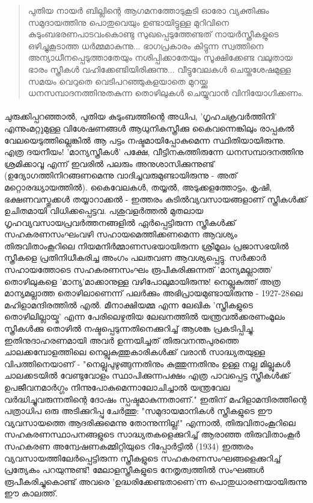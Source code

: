 \begin{quotation}
\noindent
പുതിയ  നായർ ബില്ലിന്റെ ആഗമനത്തോടുകൂടി ഓരോ വ്യക്തിക്കും സമുദായത്തിനു പൊതുവെയും ഉണ്ടായിട്ടുള്ള മുറിവിനെ കുടുംബഭരണപാടവംകൊണ്ടു സുഖപ്പെടുത്തേണ്ടത് നായർസ്ത്രീകളുടെ ഒഴിച്ചുകൂടാത്ത ധർമ്മമാകുന്നു...
ഭാഗപ്രകാരം കിട്ടുന്ന സ്വത്തിനെ അന്യാധീനപ്പെടുത്താതേയും നശിപ്പിക്കാതേയും സൂക്ഷിക്കേണ്ട വലുതായ ഭാരം സ്ത്രീകൾ വഹിക്കേണ്ടിയിരിക്കുന്നു... വീട്ടുവേലകൾ ചെയ്തശേഷമുള്ള സമയം വെറുതെ വെടിപറഞ്ഞുകളയാതെ മുറയ്ക്കു ധനസമ്പാദനത്തിനുതകുന്ന തൊഴിലുകൾ ചെയ്യുവാൻ വിനിയോഗിക്കണം.
\end{quotation}

\paragraph{}ചുരുക്കിപ്പറഞ്ഞാൽ, പുതിയ കുടുംബത്തിന്റെ അധിപ, 'ഗൃഹചക്രവർത്തിനി' എന്നുംമറ്റുമുള്ള വിശേഷണങ്ങൾ ആധുനികസ്ത്രീക്കു കൈവന്നെങ്കിലും രാപ്പകൽ വേലയെടുത്തില്ലെങ്കിൽ ആ പട്ടം നഷ്ടമായിപ്പോകുമെന്ന സ്ഥിതിയായിരുന്നു. എത്ര ദയനീയം! 'മാന്യസ്ത്രീകൾ' പക്ഷേ, വീട്ടിനകത്തിരുന്നേ ധനസമ്പാദനത്തിനു ശ്രമിക്കാവൂ എന്ന് ഇവരിൽ പലരും അനുശാസിക്കുന്നുണ്ട് (ഉദ്യോഗത്തിനിറങ്ങണമെന്നു വാദിച്ചവരുമുണ്ടായിരുന്നു - അത് മറ്റൊരദ്ധ്യായത്തിൽ). കൈവേലകൾ, തയ്യൽ, അടുക്കളത്തോട്ടം, കൃഷി, ഭക്ഷണവസ്തുക്കൾ തയ്യാറാക്കൽ - ഇത്തരം കുടിൽവ്യവസായങ്ങളാണ് സ്ത്രീകൾക്ക് ഉചിതമായി വിധിക്കപ്പെട്ടവ. പശുവളർത്തൽ മുതലായ ഗൃഹവ്യവസായപ്രവർത്തനങ്ങളിൽ ഏർപ്പെട്ടിരുന്ന സ്ത്രീകൾക്ക് സഹകരണസംഘംവഴി സഹായമെത്തിക്കണമെന്ന ആവശ്യം തിരുവിതാംകൂറിലെ നിയമനിർമ്മാണസഭയായിരുന്ന ശ്രീമൂലം പ്രജാസഭയിൽ സ്ത്രീകളെ പ്രതിനിധീകരിച്ച അംഗം പലതവണ ആവശ്യപ്പെട്ടു. സർക്കാർ സഹായത്തോടെ സഹകരണസംഘം രൂപീകരിക്കുന്നത് 'മാന്യമല്ലാത്ത' തൊഴിലുകളെ 'മാന്യ'മാക്കാനുള്ള വഴിപോലുമായിരുന്നു! നെല്ലുകുത്ത് അത്ര മാന്യമല്ലാത്ത തൊഴിലാണെന്ന് പലർക്കും അഭിപ്രായമുണ്ടായിരുന്നു - 1927-28ലെ മഹിളാമന്ദിരത്തിൽ എൽ. മീനാക്ഷിയമ്മ എന്ന ലേഖിക 'സ്ത്രീകളുടെ തൊഴിലില്ലായ്മ' എന്ന പേരിലെഴുതിയ ലേഖനത്തിൽ യന്ത്രവൽക്കരണംമൂലം സ്ത്രീകൾക്കു തൊഴിൽ നഷ്ടപ്പെടുന്നതിനെക്കുറിച്ച് ആശങ്ക പ്രകടിപ്പിച്ചു. ഇതിനുദാഹരണമായി അവർ ഉന്നയിച്ചത് തിരുവനന്തപുരത്തെ ചാലക്കമ്പോളത്തിലെ നെല്ലുകുത്തുകാരികൾക്ക് വരാൻ സാദ്ധ്യതയുള്ള വിപത്തിനെയാണ് - "നെല്ലുപുഴുങ്ങുന്നതിനും കുത്തുന്നതിനും ഉള്ള നല്ല മില്ലുകൾ ചാലക്കടയിൽ വേണ്ടുവോളം സ്ഥാപിക്കുന്നപക്ഷം എത്ര പാവപ്പെട്ട സ്ത്രീകൾക്ക് ഉപജീവനമാർഗ്ഗം നിന്നുപോകുമെന്നാലോചിച്ചാൽ യന്ത്രവേല വർദ്ധിച്ചുവരുന്നതിന്റെ ദോഷം സ്പഷ്ടമാകുന്നതാണ്." ഇതിന് മഹിളാമന്ദിരത്തിന്റെ പത്രാധിപ ഒരു അടിക്കുറിപ്പു ചേർത്തു: "സമുദായമാനികൾ സ്ത്രീകളുടെ ഈ വ്യവസായത്തെ ആദരിക്കുമെന്നു തോന്നുന്നില്ല!" എന്നാൽ, തിരുവിതാംകൂറിലെ സഹകരണസ്ഥാപനങ്ങളുടെ സാദ്ധ്യതകളെക്കുറിച്ച് ആരാഞ്ഞ തിരുവിതാംകൂർ സഹകരണ അന്വേഷണകമ്മിറ്റിയുടെ റിപ്പോർട്ടിൽ (1934) ഇത്തരം വ്യവസായത്തിലേർപ്പെട്ടിരുന്ന സ്ത്രീകളുടെ സഹകരണസംഘങ്ങളെക്കുറിച്ച് പ്രത്യേകം പറയുന്നുണ്ട്! മേലാളസ്ത്രീകളുടെ നേതൃത്വത്തിൽ സംഘങ്ങൾ രൂപീകരിച്ചുകൊണ്ട് അവരെ 'ഉദ്ധരിക്കേണ്ടതാണെ'ന്ന പൊതുധാരണയായിരുന്നു ഈ കാലത്ത്.


